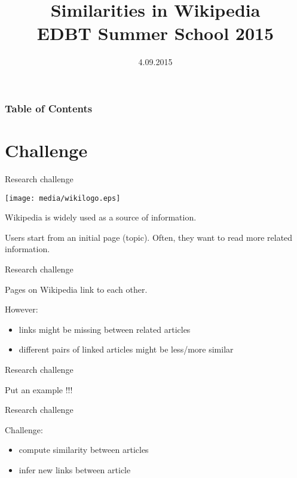 \documentclass[xcolor=dvipsnames]{beamer}
\begin{document}
\begin{frame}
\title[Challenge 4]{Similarities in Wikipedia \\ EDBT Summer School 2015}
\author[]{}
\date{4.09.2015}
\maketitle
\end{frame}


\begin{frame}
\frametitle{Table of Contents}
\tableofcontents
\end{frame}


\section{Challenge}

\begin{frame}{Research challenge}
 
\begin{center}
\texttt{[image: media/wikilogo.eps]}
\end{center}

Wikipedia is widely used as a source of information. 

Users start from an initial page (topic). Often, they want to read more related information.

\end{frame}

\begin{frame}{Research challenge}

Pages on Wikipedia link to each other.


However:

\begin{itemize}
\item links might be missing between related articles
\item different pairs of linked articles might be less/more similar
\end{itemize}

\end{frame}


\begin{frame}{Research challenge}

Put an example !!!

\end{frame}

\begin{frame}{Research challenge}


Challenge:

\begin{itemize}
\item compute similarity between articles
\item infer new links between article
\end{itemize}

\end{frame}
\end{document}

